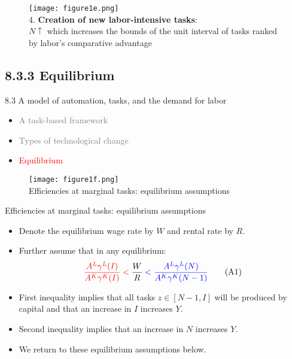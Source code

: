 \documentclass[notes=show]{beamer}
\begin{document}
\newpage
\begin{center}
\begin{figure}
\texttt{[image: figure1e.png]}
\\ 4. \textbf{Creation of new labor-intensive tasks}: \\
$N \uparrow $ which increases the bounds of the unit interval of tasks ranked by labor's comparative advantage
\end{figure} 
\end{center}
\newpage

\subsection{8.3.3 Equilibrium}

\begin{frame}{8.3 A model of automation, tasks, and the demand for labor}
\begin{itemize}
\item[\textcolor{gray}{8.3.1}] \textcolor{gray}{A task-based framework} \bigskip
\item[\textcolor{gray}{8.3.2}] \textcolor{gray}{Types of technological change} \bigskip
\item[\textcolor{red}{8.3.3}] \textcolor{red}{Equilibrium}
\end{itemize}
\end{frame}

\newpage
\begin{center}
\begin{figure}
\texttt{[image: figure1f.png]}
\\ Efficiencies at marginal tasks: equilibrium assumptions
\end{figure} 
\end{center}
\newpage

\begin{frame}{Efficiencies at marginal tasks: equilibrium assumptions}
\begin{itemize}
\item Denote the equilibrium wage rate by $W$ and rental rate by $R$. \medskip
\item Further assume that in any equilibrium:
\[
\color{red} \frac{A^{L}\gamma^{L}(I)}{A^{K}\gamma^{K}(I)} < \color{black} \frac{W}{R} \color{blue} < \frac{A^{L}\gamma^{L}(N)}{A^{K}\gamma^{K}(N-1)} \color{black} \tag{A1} \label{eqA1}
\]
\item First inequality implies that all tasks $z \in [N-1,I]$ will be produced by capital and that an increase in $I$ increases $Y$. \medskip
\item Second inequality implies that an increase in $N$ increases $Y$. \medskip
\item We return to these equilibrium assumptions below. 
\end{itemize}
\end{frame}
\end{document}
